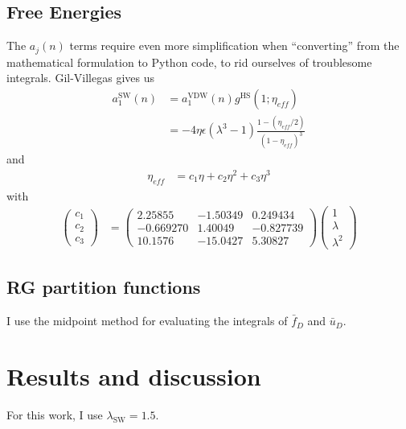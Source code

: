 \documentclass[letterpaper,twocolumn,amsmath,amssymb,prb]{revtex4-1}
\newcommand{\1}{\ensuremath{\textbf{r}_1}}
\newcommand{\2}{\ensuremath{\textbf{r}_2}}
\newcommand{\3}{\ensuremath{\textbf{r}_3}}
\newcommand{\4}{\ensuremath{\textbf{r}_4}}
\begin{document}
\subsection{Free Energies}\label{subsec:free-energies}
The $a_j(n)$ terms require even more simplification when
``converting'' from the mathematical formulation to Python code, to
rid ourselves of troublesome integrals. Gil-Villegas gives us
\newcommand\eff{\textit{eff}}
\begin{align}
  a_1^\text{SW}(n) &= a_1^\text{VDW}(n)g^\text{HS}(1;\eta_{\eff}) \\
  &= -4\eta\epsilon(\lambda^3 - 1)\frac{1 - \left( \eta_{\eff}/2 \right)}{(1 - \eta_{\eff})^3}
\end{align}
and
\begin{align}
  \eta_{\eff} &= c_1\eta + c_2\eta^2 + c_3\eta^3
\end{align}
with
\begin{align}
  \left( \begin{array}{c}
    c_1 \\
    c_2 \\
    c_3
    \end{array} \right)
  &= \left( \begin{array}{ccc}
    2.25855 & -1.50349 & 0.249434 \\
    -0.669270 & 1.40049 & -0.827739 \\
    10.1576 & -15.0427 & 5.30827
    \end{array} \right)
  \left( \begin{array}{c}
    1 \\
    \lambda \\
    \lambda^2
    \end{array} \right)
\end{align}

\subsection{RG partition functions}\label{subsec:fbar-ubar}
I use the midpoint method for evaluating the integrals of $\bar{f}_D$
and $\bar{u}_D$.

\section{Results and discussion}\label{sec:results}

For this work, I use $\lambda_\text{SW} = 1.5$.
\end{document}

